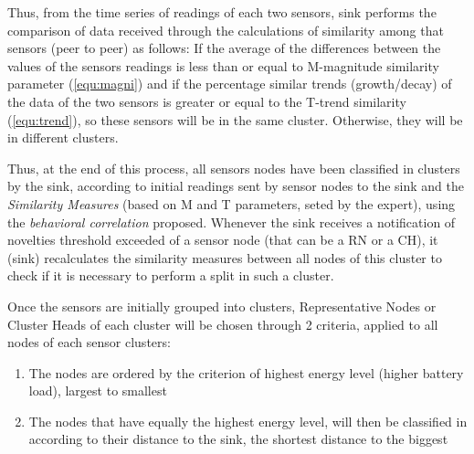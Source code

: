 \documentclass[conference]{IEEEtran}
\begin{document}
Thus, from the time series of readings of each two sensors, sink performs the
comparison of data received through the calculations of similarity among that
sensors (peer to peer) as follows:
If the average of the differences between the values of the sensors readings is
less than or equal to M-magnitude similarity parameter (\ref{equ:magni}) and if
the percentage similar trends (growth/decay) of the data of the two sensors is
greater or equal to the T-trend similarity (\ref{equ:trend}), so these sensors
will be in the same cluster.
Otherwise, they will be in different clusters.


Thus, at the end of this process, all sensors nodes have been classified in
clusters by the sink, according to initial readings sent by sensor nodes to the
sink and the \textit{Similarity Measures} (based on M and T parameters, seted by
the expert), using the \textit{behavioral correlation} proposed.
Whenever the sink receives a notification of novelties threshold exceeded of a
sensor node (that can be a RN or a CH), it (sink) recalculates the similarity
measures between all nodes of this cluster to check if it is necessary to
perform a split in such a cluster.

Once the sensors are initially grouped into clusters, Representative Nodes or
Cluster Heads of each cluster will be chosen through 2 criteria, applied to all
nodes of each sensor clusters:
\begin{enumerate}
    \item The nodes are ordered by the criterion of highest energy level (higher
    battery load), largest to smallest
    \item The nodes that have equally the highest energy level, will then be
    classified in according to their distance to the sink, the shortest distance
    to the biggest
 \end{enumerate}
\end{document}

